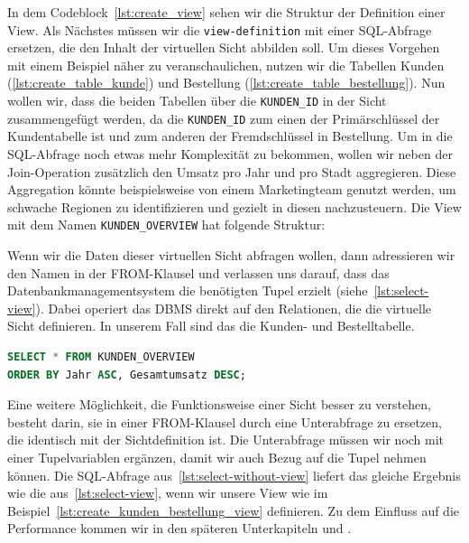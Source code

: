 In dem Codeblock~\ref{lst:create_view} sehen wir die Struktur der Definition einer View.
Als Nächstes müssen wir die \texttt{view-definition} mit einer SQL-Abfrage ersetzen, die den Inhalt der virtuellen Sicht abbilden soll.
Um dieses Vorgehen mit einem Beispiel näher zu veranschaulichen, nutzen wir die Tabellen Kunden (\ref{lst:create_table_kunde}) und Bestellung (\ref{lst:create_table_bestellung}).
Nun wollen wir, dass die beiden Tabellen über die \texttt{KUNDEN\_ID} in der Sicht zusammengefügt werden, da die \texttt{KUNDEN\_ID} zum einen der Primärschlüssel der Kundentabelle ist und zum anderen der Fremdschlüssel in Bestellung.
Um in die SQL-Abfrage noch etwas mehr Komplexität zu bekommen, wollen wir neben der Join-Operation zusätzlich den Umsatz pro Jahr und pro Stadt aggregieren.
Diese Aggregation könnte beispielsweise von einem Marketingteam genutzt werden, um schwache Regionen zu identifizieren und gezielt in diesen nachzusteuern.
Die View mit dem Namen \texttt{KUNDEN\_OVERVIEW} hat folgende Struktur:

\vspace{-5pt}


Wenn wir die Daten dieser virtuellen Sicht abfragen wollen, dann adressieren wir den Namen in der FROM-Klausel und verlassen uns darauf, dass das Datenbankmanagementsystem die benötigten Tupel erzielt (siehe~\ref{lst:select-view}).
Dabei operiert das DBMS direkt auf den Relationen, die die virtuelle Sicht definieren.
In unserem Fall sind das die Kunden- und Bestelltabelle.

\vspace{-5pt}
\begin{lstlisting}[language=SQL,caption=SQL-Befehl mit Sicht,label={lst:select-view}]
SELECT * FROM KUNDEN_OVERVIEW
ORDER BY Jahr ASC, Gesamtumsatz DESC;
\end{lstlisting}
\vspace{-5pt}

Eine weitere Möglichkeit, die Funktionsweise einer Sicht besser zu verstehen, besteht darin, sie in einer FROM-Klausel durch eine Unterabfrage zu ersetzen, die identisch mit der Sichtdefinition ist.
Die Unterabfrage müssen wir noch mit einer Tupelvariablen ergänzen, damit wir auch Bezug auf die Tupel nehmen können.
Die SQL-Abfrage aus~\ref{lst:select-without-view} liefert das gleiche Ergebnis wie die aus~\ref{lst:select-view}, wenn wir unsere View wie im Beispiel~\ref{lst:create_kunden_bestellung_view} definieren.
Zu dem Einfluss auf die Performance kommen wir in den späteren Unterkapiteln  und .

